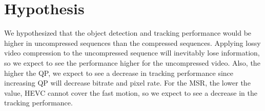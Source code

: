 \section{Hypothesis}
\label{sec:background/section_e}

We hypothesized that the object detection and tracking performance would be higher in uncompressed sequences than the compressed sequences. Applying lossy video compression to the uncompressed sequence will inevitably lose information, so we expect to see the performance higher for the uncompressed video. Also, the higher the QP, we expect to see a decrease in tracking performance since increasing QP will decrease bitrate and pixel rate. For the MSR, the lower the value, HEVC cannot cover the fast motion, so we expect to see a decrease in the tracking performance.